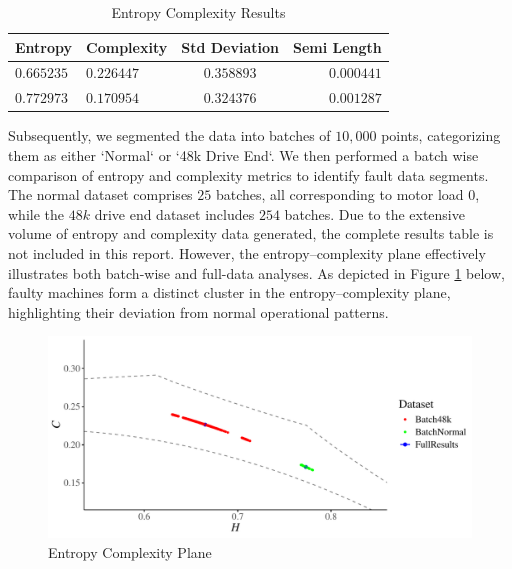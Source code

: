 \begin{table}[H]
	\centering
	\begin{tabular}{llcr}
		\toprule
		Entropy  & Complexity  & Std Deviation & Semi Length \\
		\midrule
	   $0.665235$ & $0.226447$ & $0.358893$ & $0.000441$\\ 
	   $0.772973$ & $0.170954$ & $0.324376$ & $0.001287$\\
		\bottomrule
	\end{tabular}
	\caption{Entropy Complexity Results}
	\label{tab:EnComplexResults}
\end{table}

Subsequently, we segmented the data into batches of $10,000$ points, categorizing them as either `Normal` or `48k Drive End`. We then performed a batch wise comparison of entropy and complexity metrics to identify fault data segments. 
The normal dataset comprises $25$ batches, all corresponding to motor load $0$, while the $48k$ drive end dataset includes $254$ batches. Due to the extensive volume of entropy and complexity data generated, the complete results table is not included in this report. However, the entropy–complexity plane effectively illustrates both batch-wise and full-data analyses. As depicted in Figure \ref{fig:EntopyComplexity Plane} below, faulty machines form a distinct cluster in the entropy–complexity plane, highlighting their deviation from normal operational patterns. 

\begin{figure}[hbt]
	\centering
	\includegraphics[width=0.8 \textwidth]{confidence_interval}
	\caption{Entropy Complexity Plane}
	\label{fig:EntopyComplexity Plane}
\end{figure}

